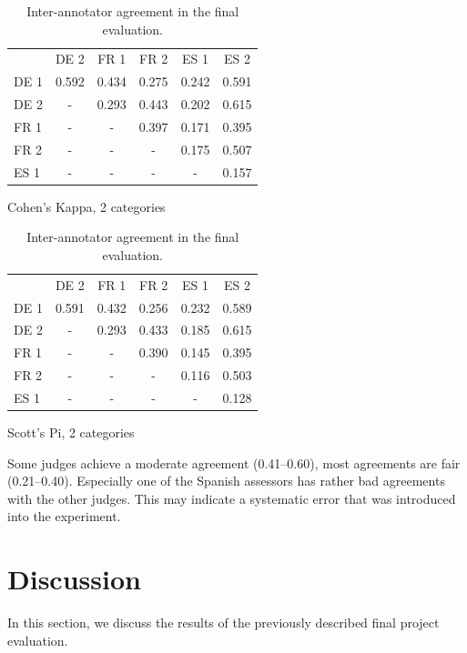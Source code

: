 \documentclass[a4paper,11pt]{article}
\begin{document}
\begin{table}[ht]
\begin{subtable}{.54\textwidth}
\begin{tabular}{p{0.85cm}ccccc}
 \addlinespace
 \toprule
 \addlinespace
 & DE 2 & FR 1 & FR 2 & ES 1 & ES 2\\
\addlinespace
\cmidrule{1-6}
\addlinespace
DE 1 & 0.592 & 0.434 & 0.275 & 0.242 & 0.591\\
\addlinespace
\cmidrule{1-6}
\addlinespace
DE 2 & - & 0.293 & 0.443 & 0.202 & 0.615\\
\addlinespace
\cmidrule{1-6}
\addlinespace
FR 1 & - & - & 0.397 & 0.171 & 0.395\\
\addlinespace
\cmidrule{1-6}
\addlinespace
FR 2 & - & - & - & 0.175 & 0.507\\
\addlinespace
\cmidrule{1-6}
\addlinespace
ES 1 & - & - & - & - & 0.157\\
\bottomrule
\end{tabular}
\caption{Cohen's Kappa, 2 categories}
\end{subtable}%
\begin{subtable}{.54\textwidth}
\begin{tabular}{p{0.85cm}ccccc}
 \addlinespace
 \toprule
 \addlinespace
 & DE 2 & FR 1 & FR 2 & ES 1 & ES 2\\
\addlinespace
\cmidrule{1-6}
\addlinespace
DE 1 & 0.591 & 0.432 & 0.256 & 0.232 & 0.589 \\
\addlinespace
\cmidrule{1-6}
\addlinespace
DE 2 & - & 0.293 & 0.433 & 0.185 & 0.615\\
\addlinespace
\cmidrule{1-6}
\addlinespace
FR 1 & - & - & 0.390 & 0.145 & 0.395\\
\addlinespace
\cmidrule{1-6}
\addlinespace
FR 2 & - & - & - & 0.116 & 0.503 \\
\addlinespace
\cmidrule{1-6}
\addlinespace
ES 1 & - & - & - & - & 0.128 \\
\bottomrule
\end{tabular}
\caption{Scott's Pi, 2 categories}
\end{subtable}
\caption{Inter-annotator agreement in the final evaluation.}
\label{iaa_scores_final}
\end{table}

Some judges achieve a moderate agreement (0.41--0.60), most agreements are fair (0.21--0.40). Especially one of the Spanish assessors has rather bad agreements with the other judges. This may indicate a systematic error that was introduced into the experiment.

\section{Discussion}
In this section, we discuss the results of the previously described final project evaluation.
\end{document}
